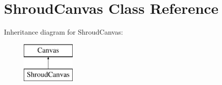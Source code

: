 \hypertarget{class_shroud_canvas}{\section{Shroud\-Canvas Class Reference}
\label{class_shroud_canvas}
}
Inheritance diagram for Shroud\-Canvas\-:\begin{figure}[H]
\begin{center}
\leavevmode
\includegraphics[height=2.000000cm]{class_shroud_canvas}
\end{center}
\end{figure}
